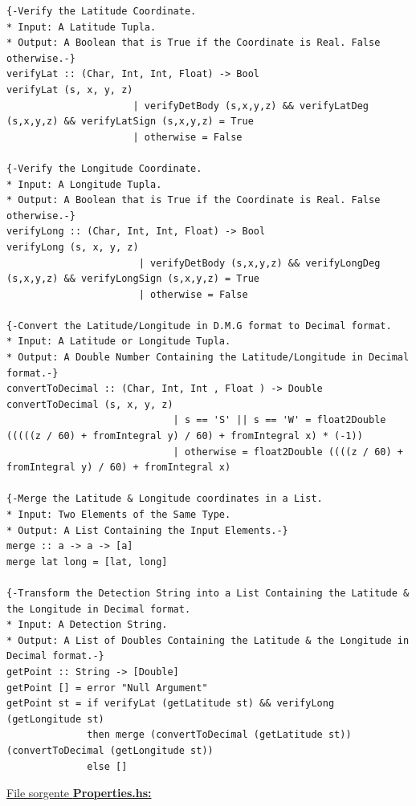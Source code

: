 \documentclass{article}
\begin{document}
\begin{lstlisting}
{-Verify the Latitude Coordinate.
* Input: A Latitude Tupla.
* Output: A Boolean that is True if the Coordinate is Real. False otherwise.-}
verifyLat :: (Char, Int, Int, Float) -> Bool 
verifyLat (s, x, y, z)  
                      | verifyDetBody (s,x,y,z) && verifyLatDeg (s,x,y,z) && verifyLatSign (s,x,y,z) = True
                      | otherwise = False

{-Verify the Longitude Coordinate.
* Input: A Longitude Tupla.
* Output: A Boolean that is True if the Coordinate is Real. False otherwise.-}
verifyLong :: (Char, Int, Int, Float) -> Bool 
verifyLong (s, x, y, z)  
                       | verifyDetBody (s,x,y,z) && verifyLongDeg (s,x,y,z) && verifyLongSign (s,x,y,z) = True
                       | otherwise = False
                     
{-Convert the Latitude/Longitude in D.M.G format to Decimal format.
* Input: A Latitude or Longitude Tupla.
* Output: A Double Number Containing the Latitude/Longitude in Decimal format.-}
convertToDecimal :: (Char, Int, Int , Float ) -> Double  
convertToDecimal (s, x, y, z) 
                             | s == 'S' || s == 'W' = float2Double (((((z / 60) + fromIntegral y) / 60) + fromIntegral x) * (-1))
                             | otherwise = float2Double ((((z / 60) + fromIntegral y) / 60) + fromIntegral x)

{-Merge the Latitude & Longitude coordinates in a List.
* Input: Two Elements of the Same Type.
* Output: A List Containing the Input Elements.-}
merge :: a -> a -> [a]
merge lat long = [lat, long]

{-Transform the Detection String into a List Containing the Latitude & the Longitude in Decimal format.
* Input: A Detection String.
* Output: A List of Doubles Containing the Latitude & the Longitude in Decimal format.-}
getPoint :: String -> [Double]
getPoint [] = error "Null Argument"
getPoint st = if verifyLat (getLatitude st) && verifyLong (getLongitude st) 
              then merge (convertToDecimal (getLatitude st)) (convertToDecimal (getLongitude st))
              else []
\end{lstlisting}
\underline{File sorgente \textbf{Properties.hs:}}
\lstset{language=Haskell}
\end{document}
